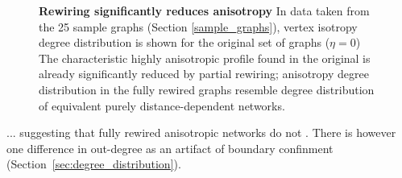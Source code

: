 \begin{figure}[H]
  \centering
  \caption{\textbf{Rewiring significantly reduces anisotropy} In data
    taken from the 25 sample graphs (Section \ref{sample_graphs}), vertex isotropy degree
    distribution is shown for the original set of graphs ($\eta = 0$)
    The characteristic highly anisotropic profile found in the
    original is already significantly reduced by partial rewiring;
    anisotropy degree distribution in the fully rewired graphs
    resemble degree distribution of equivalent purely
    distance-dependent networks.}%
  \label{fig:anisotropy} %
\end{figure}


... suggesting that fully rewired anisotropic networks do not . There
is however one difference in out-degree as an artifact of boundary
confinment (Section~\ref{sec:degree_distribution}).



